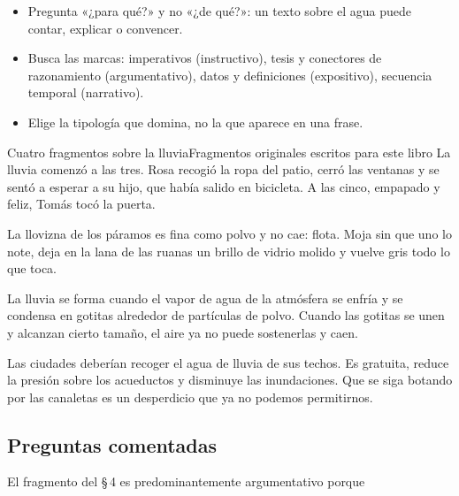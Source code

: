 
\begin{regla}
\begin{itemize}
  \item Pregunta «¿para qué?» y no «¿de qué?»: un texto sobre el agua puede contar, explicar o convencer.
  \item Busca las marcas: imperativos (instructivo), tesis y conectores de razonamiento (argumentativo), datos y
  definiciones (expositivo), secuencia temporal (narrativo).
  \item Elige la tipología que domina, no la que aparece en una frase.
\end{itemize}
\end{regla}

\begin{texto}{Cuatro fragmentos sobre la lluvia}{Fragmentos originales escritos para este libro}
\pa La lluvia comenzó a las tres. Rosa recogió la ropa del patio, cerró las ventanas y se sentó a esperar a su hijo, que
había salido en bicicleta. A las cinco, empapado y feliz, Tomás tocó la puerta.

\pa La llovizna de los páramos es fina como polvo y no cae: flota. Moja sin que uno lo note, deja en la lana de las ruanas
un brillo de vidrio molido y vuelve gris todo lo que toca.

\pa La lluvia se forma cuando el vapor de agua de la atmósfera se enfría y se condensa en gotitas alrededor de partículas
de polvo. Cuando las gotitas se unen y alcanzan cierto tamaño, el aire ya no puede sostenerlas y caen.

\pa Las ciudades deberían recoger el agua de lluvia de sus techos. Es gratuita, reduce la presión sobre los acueductos y
disminuye las inundaciones. Que se siga botando por las canaletas es un desperdicio que ya no podemos permitirnos.
\end{texto}

\subsection{Preguntas comentadas}
\begin{comentada}{El fragmento del \S\,4 es predominantemente argumentativo porque}
\end{comentada}

